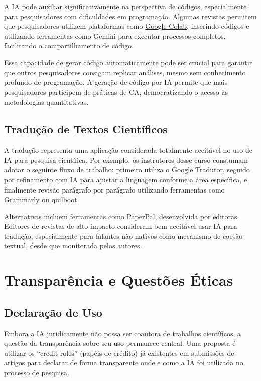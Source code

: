 \documentclass[
  a4paper,
]{book}
\begin{document}
A IA pode auxiliar significativamente na perspectiva de códigos,
especialmente para pesquisadores com dificuldades em programação.
Algumas revistas permitem que pesquisadores utilizem plataformas como
\href{https://colab.google/}{Google Colab}, inserindo códigos e
utilizando ferramentas como Gemini para executar processos completos,
facilitando o compartilhamento de código.

Essa capacidade de gerar código automaticamente pode ser crucial para
garantir que outros pesquisadores consigam replicar análises, mesmo sem
conhecimento profundo de programação. A geração de código por IA permite
que mais pesquisadores participem de práticas de CA, democratizando o
acesso às metodologias quantitativas.

\subsection{Tradução de Textos
Científicos}\label{traduuxe7uxe3o-de-textos-cientuxedficos}

A tradução representa uma aplicação considerada totalmente aceitável no
uso de IA para pesquisa científica. Por exemplo, os instrutores desse
curso constumam adotar o seguinte fluxo de trabalho: primeiro utiliza o
\href{https://translate.google.com.br/}{Google Tradutor}, seguido por
refinamento com IA para ajustar a linguagem conforme a área específica,
e finalmente revisão parágrafo por parágrafo utilizando ferramentas como
\href{https://www.grammarly.com/}{Grammarly} ou
\href{https://quillbot.com/}{quilboot}.

Alternativas incluem ferramentas como
\href{https://paperpal.com/}{PaperPal}, desenvolvida por editoras.
Editores de revistas de alto impacto consideram bem aceitável usar IA
para tradução, especialmente para falantes não nativos como mecanismo de
coesão textual, desde que monitorada pelos autores.

\section{Transparência e Questões
Éticas}\label{transparuxeancia-e-questuxf5es-uxe9ticas}

\subsection{Declaração de Uso}\label{declarauxe7uxe3o-de-uso}

Embora a IA juridicamente não possa ser coautora de trabalhos
científicos, a questão da transparência sobre seu uso permanece central.
Uma proposta é utilizar os ``credit roles'' (papéis de crédito) já
existentes em submissões de artigos para declarar de forma transparente
onde e como a IA foi utilizada no processo de pesquisa.
\end{document}
